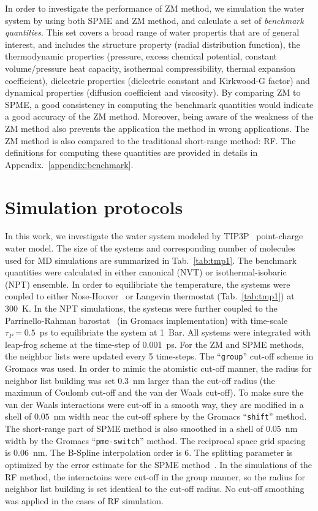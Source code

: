 \documentclass[aip,jcp,a4paper,preprint,unsortedaddress,onecolumn,fleqn]{revtex4-1}
\begin{document}
In order to investigate the performance of ZM method, we simulation
the water system by using both SPME and ZM method, and calculate a set
of \emph{benchmark quantities}.  This set covers a broad range of
water propertis that are of general interest, and includes the
structure property (radial distribution function), the thermodynamic
properties (pressure, excess chemical potential, constant
volume/pressure heat capacity, isothermal compressibility, thermal
expansion coefficient), dielectric properties (dielectric constant and
Kirkwood-G factor) and dynamical properties (diffusion coefficient and
viscosity).  By comparing ZM to SPME, a good consistency in computing
the benchmark quantities would indicate a good accuracy of the ZM
method.  Moreover, being aware of the weakness of the ZM method also
prevents the application the method in wrong applications.  The ZM
method is also compared to the traditional short-range method: RF.
The definitions for computing these quantities are provided in details
in Appendix.~\ref{appendix:benchmark}.


\section{Simulation protocols}

In this work, we investigate the water system modeled by
TIP3P~\cite{jorgensen1983comparison} point-charge water model.
The size of the systems and corresponding number of molecules used for MD simulations are summarized in Tab.~\ref{tab:tmp1}.
The benchmark quantities were calculated in either  canonical (NVT) or isothermal-isobaric (NPT) ensemble.
In order to equilibriate the temperature,
the systems were coupled to either Nose-Hoover~\cite{nose1984molecular,hoover1985canonical} or Langevin thermostat (Tab.~\ref{tab:tmp1})
at 300~K.
In the NPT simulations, the systems were further coupled
to the Parrinello-Rahman barostat~\cite{parrinello1980crystal,parrinello1981polymorphic} (in Gromacs implementation)
with time-scale $\tau_P = 0.5$~ps to equilibriate the system at 1~Bar.
All systems were integrated with leap-frog scheme at the time-step of 0.001~ps.
For the ZM and SPME methods,
the neighbor lists were updated every 5 time-steps.
The ``\texttt{group}'' cut-off scheme in Gromacs was used. In order to mimic the atomistic
cut-off manner, the radius for neighbor list building was set 0.3~nm
larger than the cut-off radius (the maximum of Coulomb cut-off and the van der Waals cut-off).
To make sure the van der Waals interactions were cut-off in a smooth way,
they are modified in a shell of $0.05$~nm width near the cut-off sphere by the Gromacs ``\texttt{shift}'' method.
The short-range part of SPME method is also smoothed in a shell of $0.05$~nm width  by the Gromacs ``\texttt{pme-switch}'' method.
The reciprocal space
grid spacing is 0.06~nm. The B-Spline interpolation order is 6. The
splitting parameter is optimized by the error estimate for the SPME method~\cite{wang2010optimizing}.
In the simulations of the RF method, the interactoins were cut-off in the group manner,
so the radius for neighbor list building is set identical to the cut-off radius.
No cut-off smoothing was applied in the cases of RF simulation.
\end{document}
